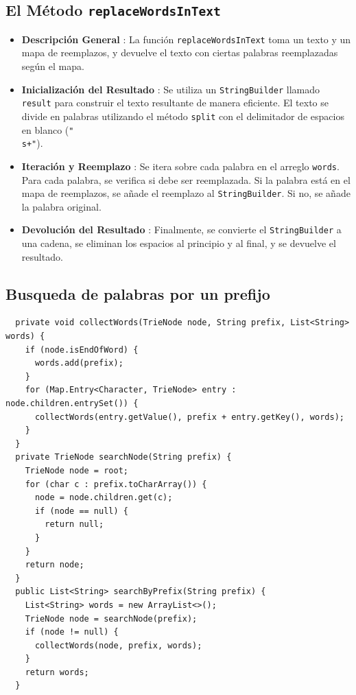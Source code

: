 \documentclass[11pt, a4paper]{article}
\begin{document}
\subsection{El Método \texttt{replaceWordsInText}}
\begin{itemize}
  \item \textbf{Descripción General} : La función \texttt{replaceWordsInText} toma un texto y un mapa de reemplazos, y devuelve el texto con ciertas palabras reemplazadas según el mapa.
  \item \textbf{Inicialización del Resultado} : Se utiliza un \texttt{StringBuilder} llamado \texttt{result} para construir el texto resultante de manera eficiente. El texto se divide en palabras utilizando el método \texttt{split} con el delimitador de espacios en blanco (\texttt{"\\s+"}).
  \item \textbf{Iteración y Reemplazo} : Se itera sobre cada palabra en el arreglo \texttt{words}. Para cada palabra, se verifica si debe ser reemplazada. Si la palabra está en el mapa de reemplazos, se añade el reemplazo al \texttt{StringBuilder}. Si no, se añade la palabra original.
  \item \textbf{Devolución del Resultado} : Finalmente, se convierte el \texttt{StringBuilder} a una cadena, se eliminan los espacios al principio y al final, y se devuelve el resultado.
\end{itemize}

\subsection{Busqueda de palabras por un prefijo}

\begin{verbatim}
  private void collectWords(TrieNode node, String prefix, List<String> words) {
    if (node.isEndOfWord) {
      words.add(prefix);
    }
    for (Map.Entry<Character, TrieNode> entry : node.children.entrySet()) {
      collectWords(entry.getValue(), prefix + entry.getKey(), words);
    }
  }
  private TrieNode searchNode(String prefix) {
    TrieNode node = root;
    for (char c : prefix.toCharArray()) {
      node = node.children.get(c);
      if (node == null) {
        return null;
      }
    }
    return node;
  }
  public List<String> searchByPrefix(String prefix) {
    List<String> words = new ArrayList<>();
    TrieNode node = searchNode(prefix);
    if (node != null) {
      collectWords(node, prefix, words);
    }
    return words;
  }
\end{verbatim}
\end{document}
